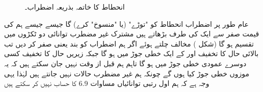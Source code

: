 \begin{figure}
\centering
{}
\caption{انحطاط کا خاتمہ بذریعہ اضطراب۔}
\label{شکل_غیر_تابع_اضطراب_اختتام_انحطاط}
\end{figure}


عام طور پر اضطراب  انحطاط کو "توڑے"  (یا "منسوخ" کرے) گا جیسے جیسے ہم  کی قیمت صفر سے ایک کی طرف بڑھاتے ہیں مشترک غیر مضطرب توانائی  دو ٹکڑوں میں تقسیم ہو گا  (شکل  ) مخالف چلتے ہوئے اگر ہم اضطراب کو بند  یعنی صفر  کر دیں تب بالائی حال کا تخفیف   اور  کے ایک خطی جوڑ میں ہو گا جبکہ زیریں حال کا تخفیف کسی دوسرے عمودی خطی جوڑ میں ہو گا تاہم ہم قبل از وقت نہیں جان سکتے ہیں کہ یہ موزوں خطی جوڑ کیا ہوں گے چونکہ ہم غیر مضطرب حالات نہیں جانتے ہیں لہٰذا  یہی وجہ ہے کہ ہم اول رتبی توانائیاں مساوات 6.9 کا حساب نہیں کر سکتے ہیں 

